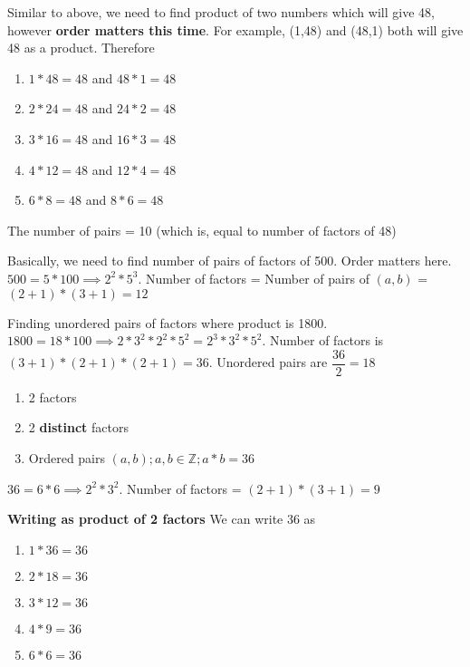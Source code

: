 
Similar to above, we need to find product of two numbers which will give 48, however \textbf{order matters this time}. For example, (1,48) and (48,1) both will give 48 as a product. Therefore
\begin{enumerate}
    \item $1 * 48 = 48$ and $48 *   1 = 48$
    \item $2 * 24 = 48$ and $24 *   2 = 48$
    \item $3 * 16 = 48$ and $16 *   3 = 48$
    \item $4 * 12 = 48$ and $12 *   4 = 48$
    \item $6 * 8 = 48$  and $8  *   6 = 48$
\end{enumerate}

The number of pairs = 10 (which is, equal to number of factors of 48)


Basically, we need to find number of pairs of factors of 500. Order matters here. $500 = 5 * 100 \implies 2^2 * 5^3$. Number of factors = Number of pairs of $(a,b)$ = $(2+1) * (3+1) = 12$


Finding unordered pairs of factors where product is 1800. $1800 = 18 * 100 \implies 2 * 3^2 * 2^2 * 5^2 = 2^3 * 3^2 * 5^2$. Number of factors is $(3+1) * (2+1) * (2+1) = 36$. Unordered pairs are $\dfrac{36}{2} = 18$

\begin{enumerate}
    \item 2 factors
    \item 2 \textbf{distinct} factors
    \item Ordered pairs $(a,b); a,b \in \mathbb{Z}; a*b = 36$
\end{enumerate}

$36 = 6 * 6 \implies 2^2 * 3^2$. Number of factors = $(2+1) * (3+1) = 9$

\textbf{Writing as product of 2 factors}
We can write 36 as 
\begin{enumerate}
    \item $1    *   36 = 36$
    \item $2    *   18 = 36$
    \item $3    *   12 = 36$
    \item $4    *   9 = 36$
    \item $6    *   6 = 36$
\end{enumerate}

